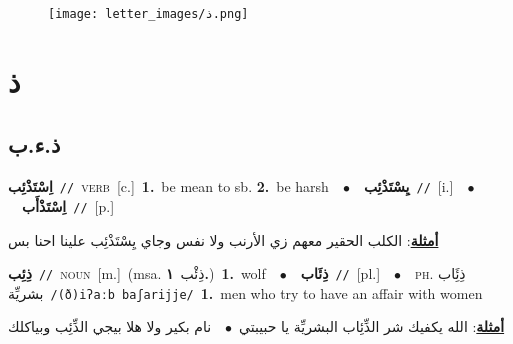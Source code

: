 \documentclass[10pt,a4paper,twoside]{article} %
\begin{document}
\begin{figure*}[t!]\centering\texttt{[image: letter\_images/ذ.png]}\end{figure*}
\color{white}

 \section*{\foreignlanguage{arabic}{ذ}} 
 \begin{multicols}{2} 

%
\color{black}
\vspace{-3mm}
\subsection*{\color{blue}\foreignlanguage{arabic}{ذ.ء.ب}\color{blue}{}} 

{\setlength\topsep{0pt}\textbf{\foreignlanguage{arabic}{اِسْتَذْئِب}}\ {\color{gray}\texttt{//}\color{black}}\ \textsc{verb}\ [c.]\ \textbf{1.}~be mean to sb.  \textbf{2.}~be harsh\ \ $\bullet$\ \ \setlength\topsep{0pt}\textbf{\foreignlanguage{arabic}{يِسْتَذْئِب}}\ {\color{gray}\texttt{//}\color{black}}\ [i.]\ \ $\bullet$\ \ \setlength\topsep{0pt}\textbf{\foreignlanguage{arabic}{اِسْتَذْأَب}}\ {\color{gray}\texttt{//}\color{black}}\ [p.]\  \begin{flushright}\color{gray}\foreignlanguage{arabic}{\textbf{\underline{\foreignlanguage{arabic}{أمثلة}}}: الكلب الحقير معهم زي الأرنب ولا نفس وجاي يِسْتَذْئِب علينا احنا بس}\end{flushright}\color{black}} \vspace{2mm}

{\setlength\topsep{0pt}\textbf{\foreignlanguage{arabic}{ذِئِب}}\ {\color{gray}\texttt{//}\color{black}}\ \textsc{noun}\ [m.]\ \color{gray}(msa. \foreignlanguage{arabic}{ذِئْب}~\foreignlanguage{arabic}{\textbf{١.}})\color{black}\ \textbf{1.}~wolf\ \ $\bullet$\ \ \setlength\topsep{0pt}\textbf{\foreignlanguage{arabic}{ذِئَاب}}\ {\color{gray}\texttt{//}\color{black}}\ [pl.]\ \ $\bullet$\ \ \textsc{ph.} \color{gray} \foreignlanguage{arabic}{ذِئَِاب بشريِّة}\color{black}\ {\color{gray}\texttt{/{\sffamily (ð)iʔaːb baʃarijje}/}\color{black}}\ \textbf{1.}~men who try to have an affair with women\  \begin{flushright}\color{gray}\foreignlanguage{arabic}{\textbf{\underline{\foreignlanguage{arabic}{أمثلة}}}: الله يكفيك شر الذِّئِاب البشريِّة يا حبيبتي\ $\bullet$\ \  نام بكير ولا هلا بيجي الذِّئِب وبياكلك}\end{flushright}\color{black}} \vspace{2mm}


\end{multicols}
\end{document}
